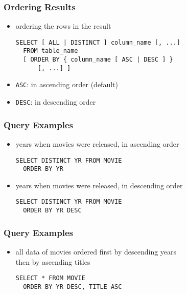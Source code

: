 \documentclass[dvipsnames]{beamer}
\theoremstyle{plain}
\begin{document}
\begin{frame}[fragile]
  \frametitle{Ordering Results}

  \begin{itemize}
    \item ordering the rows in the result
    \begin{lstlisting}
SELECT [ ALL | DISTINCT ] column_name [, ...]
  FROM table_name
  [ ORDER BY { column_name [ ASC | DESC ] }
      [, ...] ]
    \end{lstlisting}

    \medskip
    \item \lstinline!ASC!: in ascending order (default)
    \item \lstinline!DESC!: in descending order
  \end{itemize}
\end{frame}

\begin{frame}[fragile]
  \frametitle{Query Examples}

  \begin{itemize}
    \item years when movies were released, in ascending order
    \begin{lstlisting}
SELECT DISTINCT YR FROM MOVIE
  ORDER BY YR
    \end{lstlisting}

    \pause
    \item years when movies were released, in descending order
    \begin{lstlisting}
SELECT DISTINCT YR FROM MOVIE
  ORDER BY YR DESC
    \end{lstlisting}
  \end{itemize}
\end{frame}

\begin{frame}[fragile]
  \frametitle{Query Examples}

  \begin{itemize}
    \item all data of movies ordered first by descending years\\
      then by ascending titles
    \begin{lstlisting}
SELECT * FROM MOVIE
  ORDER BY YR DESC, TITLE ASC
    \end{lstlisting}
  \end{itemize}
\end{frame}
\end{document}
